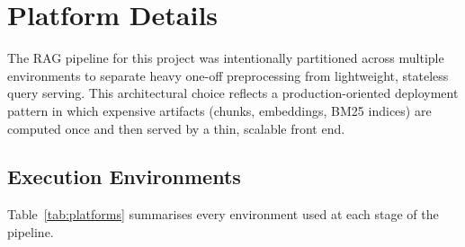 \documentclass[11pt,a4paper]{article}
\begin{document}
\newpage
\tableofcontents

\newpage
\section{Platform Details}
\label{sec:platform}

The RAG pipeline for this project was intentionally partitioned across multiple environments to separate heavy one-off preprocessing from lightweight, stateless query serving. This architectural choice reflects a production-oriented deployment pattern in which expensive artifacts (chunks, embeddings, BM25 indices) are computed once and then served by a thin, scalable front end.

\subsection{Execution Environments}

Table~\ref{tab:platforms} summarises every environment used at each stage of the pipeline.
\end{document}

